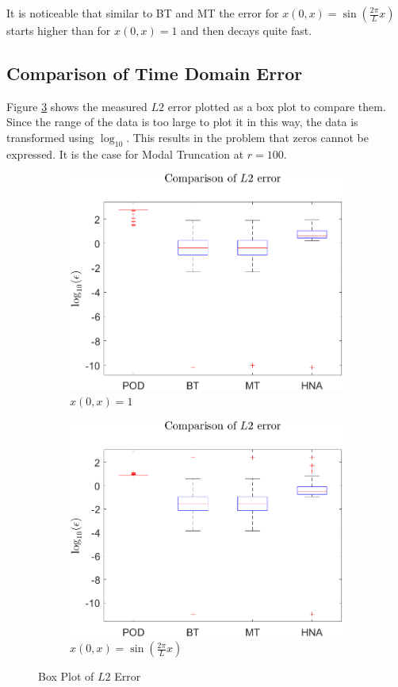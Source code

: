 It is noticeable that similar to BT and MT the error for \(x(0, x) = \sin(\frac{2\pi}{L}x)\) starts higher than for \(x(0, x) = 1\) and then decays quite fast.

\subsection{Comparison of Time Domain Error}
Figure \ref{FIG-BOX-L2} shows the measured \(L2\) error plotted as a box plot to compare them. 
Since the range of the data is too large to plot it in this way, the data is transformed using \(\log_{10}\).
This results in the problem that zeros cannot be expressed.
It is the case for Modal Truncation at \(r = 100\).
\begin{figure}[H]
\begin{subfigure}[b]{0.5\textwidth}
\centering
\includegraphics[width=\textwidth]{images/L2_BOX}
\caption{$x(0, x) = 1$}
\label{FIG-BOX}
\end{subfigure}
\begin{subfigure}[b]{0.5\textwidth}
\centering
\includegraphics[width=\textwidth]{images/L2_BOX_SIN}
\caption{$x(0, x) = \sin(\frac{2\pi}{L}x)$}
\label{FIG-BOX-SIN}
\end{subfigure}
\caption{Box Plot of \(L2\) Error}
\label{FIG-BOX-L2}
\end{figure}
